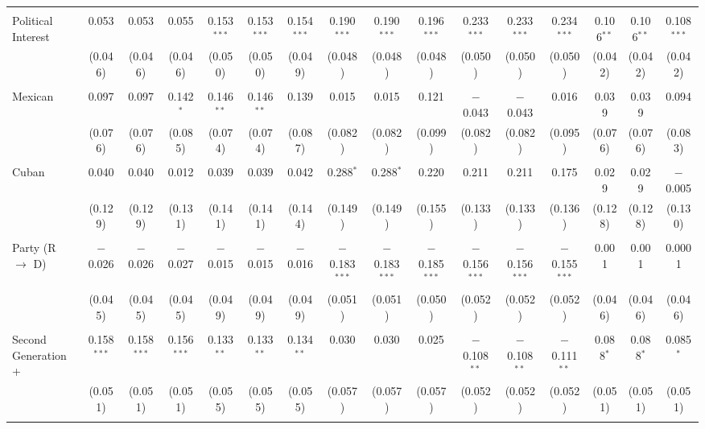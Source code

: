 \begin{table}[!htbp]
\begin{tabular}{@{\extracolsep{5pt}}lccccccccccccccc}
  & & & & & & & & & & & & & & & \\ 
 Political Interest & 0.053 & 0.053 & 0.055 & 0.153$^{***}$ & 0.153$^{***}$ & 0.154$^{***}$ & 0.190$^{***}$ & 0.190$^{***}$ & 0.196$^{***}$ & 0.233$^{***}$ & 0.233$^{***}$ & 0.234$^{***}$ & 0.106$^{**}$ & 0.106$^{**}$ & 0.108$^{***}$ \\ 
  & (0.046) & (0.046) & (0.046) & (0.050) & (0.050) & (0.049) & (0.048) & (0.048) & (0.048) & (0.050) & (0.050) & (0.050) & (0.042) & (0.042) & (0.042) \\ 
  & & & & & & & & & & & & & & & \\ 
 Mexican & 0.097 & 0.097 & 0.142$^{*}$ & 0.146$^{**}$ & 0.146$^{**}$ & 0.139 & 0.015 & 0.015 & 0.121 & $-$0.043 & $-$0.043 & 0.016 & 0.039 & 0.039 & 0.094 \\ 
  & (0.076) & (0.076) & (0.085) & (0.074) & (0.074) & (0.087) & (0.082) & (0.082) & (0.099) & (0.082) & (0.082) & (0.095) & (0.076) & (0.076) & (0.083) \\ 
  & & & & & & & & & & & & & & & \\ 
 Cuban & 0.040 & 0.040 & 0.012 & 0.039 & 0.039 & 0.042 & 0.288$^{*}$ & 0.288$^{*}$ & 0.220 & 0.211 & 0.211 & 0.175 & 0.029 & 0.029 & $-$0.005 \\ 
  & (0.129) & (0.129) & (0.131) & (0.141) & (0.141) & (0.144) & (0.149) & (0.149) & (0.155) & (0.133) & (0.133) & (0.136) & (0.128) & (0.128) & (0.130) \\ 
  & & & & & & & & & & & & & & & \\ 
 Party (R $\longrightarrow$ D) & $-$0.026 & $-$0.026 & $-$0.027 & $-$0.015 & $-$0.015 & $-$0.016 & $-$0.183$^{***}$ & $-$0.183$^{***}$ & $-$0.185$^{***}$ & $-$0.156$^{***}$ & $-$0.156$^{***}$ & $-$0.155$^{***}$ & 0.001 & 0.001 & 0.0001 \\ 
  & (0.045) & (0.045) & (0.045) & (0.049) & (0.049) & (0.049) & (0.051) & (0.051) & (0.050) & (0.052) & (0.052) & (0.052) & (0.046) & (0.046) & (0.046) \\ 
  & & & & & & & & & & & & & & & \\ 
 Second Generation + & 0.158$^{***}$ & 0.158$^{***}$ & 0.156$^{***}$ & 0.133$^{**}$ & 0.133$^{**}$ & 0.134$^{**}$ & 0.030 & 0.030 & 0.025 & $-$0.108$^{**}$ & $-$0.108$^{**}$ & $-$0.111$^{**}$ & 0.088$^{*}$ & 0.088$^{*}$ & 0.085$^{*}$ \\ 
  & (0.051) & (0.051) & (0.051) & (0.055) & (0.055) & (0.055) & (0.057) & (0.057) & (0.057) & (0.052) & (0.052) & (0.052) & (0.051) & (0.051) & (0.051) \\ 
  & & & & & & & & & & & & & & & \\ 

\end{tabular}
\end{table}
